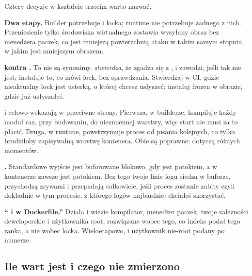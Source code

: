 
\noindent
Cztery decyzje w kształcie trzecim warto nazwać.

\textbf{Dwa etapy.} Builder potrzebuje  i locka; runtime nie
potrzebuje żadnego z nich. Przeniesienie tylko środowiska wirtualnego
zostawia wysyłany obraz bez menedżera paczek, co jest mniejszą powierzchnią
ataku w takim samym stopniu, w jakim jest mniejszym obrazem.

\textbf{ kontra .} To nie są synonimy.
 \emph{stwierdza}, że  zgadza się z
, i zawodzi, jeśli tak nie jest; 
instaluje to, co mówi lock, bez sprawdzania. Stwierdzaj w CI, gdzie
nieaktualny lock jest usterką, o której chcesz usłyszeć; instaluj frozen w
obrazie, gdzie już usłyszałeś.

 i  celowo
wskazują w przeciwne strony. Pierwsza, w builderze, kompiluje każdy moduł
raz, przy budowaniu, do niezmiennej warstwy, więc start nie musi za to
płacić. Druga, w runtime, powstrzymuje proces od pisania kolejnych, co
tylko brudziłoby zapisywalną warstwę kontenera. Obie są poprawne; dotyczą
różnych momentów.

\textbf{.} Standardowe wyjście jest buforowane
blokowo, gdy jest potokiem, a w kontenerze zawsze jest potokiem. Bez tego
twoje linie logu siedzą w buforze, przychodzą zrywami i przepadają
całkowicie, jeśli proces zostanie zabity \dash{} czyli dokładnie w tym
procesie, z którego logów najbardziej chciałeś skorzystać.

\begin{trapbox}
\textbf{\enquote{ i  w
Dockerfile.}} Działa \dash{} i wiezie kompilator, menedżer paczek, twoje
zależności deweloperskie i użytkownika root, rozwiązane wobec tego, co
indeks podał tego ranka, a nie wobec locka. Wieloetapowo,  i użytkownik nie-root podany po numerze.
\end{trapbox}

\subsection{Ile wart jest  i czego nie zmierzono}
\label{sec:ch12-measured}

